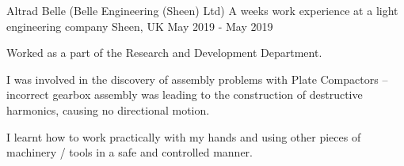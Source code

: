 \begin{cventries}
  \cventry
    {Altrad Belle (Belle Engineering (Sheen) Ltd)} %
    {A weeks work experience at a light engineering company} %
    {Sheen, UK} %
    {May 2019 - May 2019} %
    {
      \begin{cvitems} %
        \item{Worked as a part of the Research and Development Department.}
        \item {I was involved in the discovery of assembly problems with Plate Compactors – incorrect gearbox assembly was leading to the construction of destructive harmonics, causing no directional motion.}
        \item {I learnt how to work practically with my hands and using other pieces of machinery / tools in a safe and controlled manner.}
      \end{cvitems}
    }

\end{cventries}
